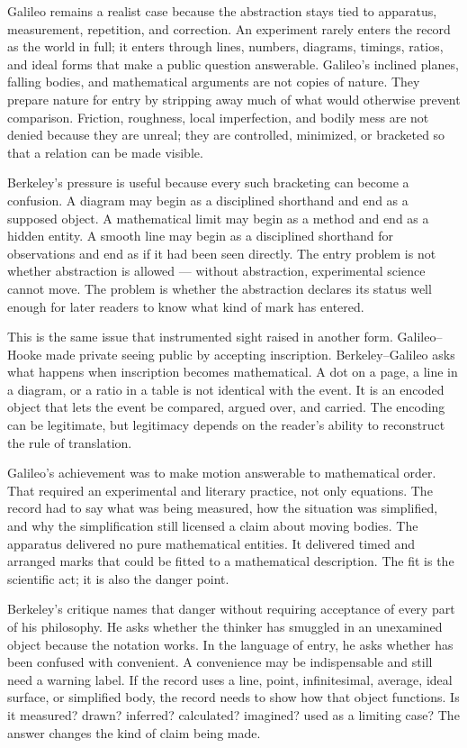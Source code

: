 Galileo remains a realist case because the abstraction stays tied to
apparatus, measurement, repetition, and correction. An experiment rarely
enters the record as the world in full; it enters through lines, numbers,
diagrams, timings, ratios, and ideal forms that make a public question
answerable. Galileo's inclined planes, falling bodies, and mathematical
arguments are not copies of nature. They prepare nature for entry by
stripping away much of what would otherwise prevent comparison. Friction,
roughness, local imperfection, and bodily mess are not denied because they
are unreal; they are controlled, minimized, or bracketed so that a relation
can be made visible.

Berkeley's pressure is useful because every such bracketing can become a
confusion. A diagram may begin as a disciplined shorthand and end as a
supposed object. A mathematical limit may begin as a method and end as a
hidden entity. A smooth line may begin as a disciplined shorthand for observations and
end as if it had been seen directly. The entry problem is not whether
abstraction is allowed --- without abstraction, experimental science cannot
move. The problem is whether the abstraction declares its status well
enough for later readers to know what kind of mark has entered.

This is the same issue that instrumented sight raised in another form.
Galileo--Hooke made private seeing public by accepting inscription.
Berkeley--Galileo asks what happens when inscription becomes mathematical.
A dot on a page, a line in a diagram, or a ratio in a table is not
identical with the event. It is an encoded object that lets the event be
compared, argued over, and carried. The encoding can be legitimate, but
legitimacy depends on the reader's ability to reconstruct the rule of
translation.

Galileo's achievement was to make motion answerable to mathematical order.
That required an experimental and literary practice, not only equations.
The record had to say what was being measured, how the situation was
simplified, and why the simplification still licensed a claim about moving
bodies. The apparatus delivered no pure mathematical entities. It delivered
timed and arranged marks that could be fitted to a mathematical description.
The fit is the scientific act; it is also the danger point.

Berkeley's critique names that danger without requiring acceptance of
every part of his philosophy. He asks whether the thinker has smuggled in
an unexamined object because the notation works. In the language of entry,
he asks whether  has been confused with convenient. A
convenience may be indispensable and still need a warning label. If the
record uses a line, point, infinitesimal, average, ideal surface, or
simplified body, the record needs to show how that object functions. Is it
measured? drawn? inferred? calculated? imagined? used as a limiting case?
The answer changes the kind of claim being made.

